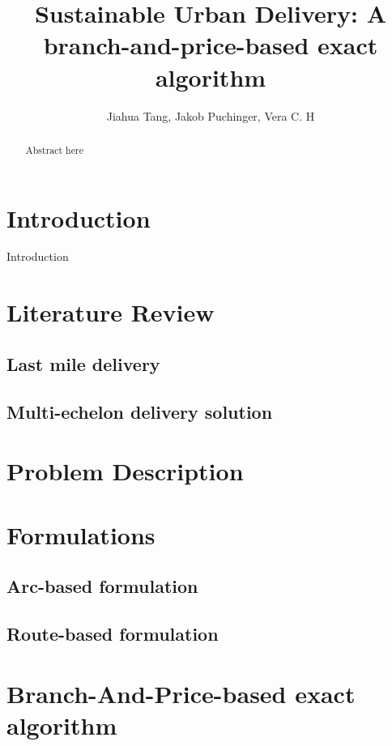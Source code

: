 \documentclass{article}
\begin{document}
\title{Sustainable Urban Delivery: A branch-and-price-based exact algorithm}
\author{Jiahua Tang, Jakob Puchinger, Vera C. H}


\maketitle


\begin{abstract}
Abstract here
\end{abstract}

\section{Introduction}
Introduction

\section{Literature Review}

\subsection{Last mile delivery}

\subsection{Multi-echelon delivery solution}

\section{Problem Description}

\section{Formulations}
\subsection{Arc-based formulation}
\subsection{Route-based formulation}

\section{Branch-And-Price-based exact algorithm}
\end{document}
